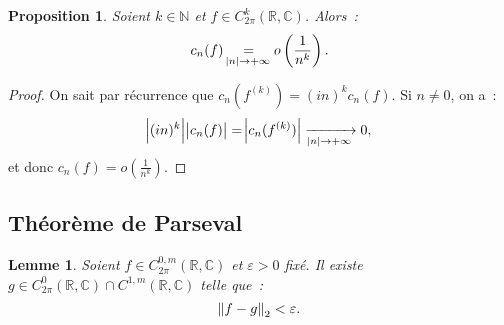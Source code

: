 \documentclass{report}
\newtheorem{prp}[thm]{Proposition}
\newtheorem{lem}[thm]{Lemme}
\theoremstyle{definition}
\theoremstyle{remark}
\numberwithin{equation}{section}
\newcommand{\C}{\mathbb C}
\newcommand{\R}{\mathbb R}
\newcommand{\N}{\mathbb N}
\newcommand{\pinfty}{{+\infty}}
\newcommand{\CmT}[2]{C^{#1,m}_{#2}}
\newcommand{\CzmT}[1]{\CmT 0{#1}}
\newcommand{\Czm}{\CzmT{2\pi}}
\begin{document}
			\begin{prp} Soient $k \in \N$ et $f \in C^k_{2\pi}(\R, \C)$. Alors~:
			\begin{equation}
				c_n(f) \underset {\abs n \to \pinfty}= o\left(\frac 1{n^k}\right).
			\end{equation}
			\end{prp}

			\begin{proof} On sait par récurrence que $c_n(f^{(k)}) = (in)^kc_n(f)$. Si $n \neq 0$, on a~:
			\begin{equation}
				\abs {(in)^k}\abs {c_n(f)} = \abs {c_n(f^{(k)})} \xrightarrow[\abs n \to \pinfty]{} 0,
			\end{equation}
			et donc $c_n(f) = o\left(\frac 1{n^k}\right)$.
			\end{proof}

		\subsection{Théorème de Parseval}  %
			\begin{lem} Soient $f \in \Czm(\R, \C)$ et $\varepsilon > 0$ fixé. Il existe $g \in C^0_{2\pi}(\R, \C) \cap C^{1,m}(\R, \C)$ telle que~:
			\begin{equation}
				\norm {f-g}_2 < \varepsilon.
			\end{equation}
			\end{lem}
\end{document}

